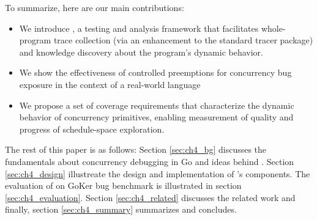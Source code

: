 To summarize, here are our main contributions:
\begin{itemize}
    \item We introduce \goat, a testing and analysis framework that facilitates whole-program trace collection (via an enhancement to the standard tracer package) and knowledge discovery about the program's dynamic behavior.
    \item We show the effectiveness of controlled preemptions for concurrency bug exposure in the context of a real-world language
    \item We propose a set of coverage requirements that characterize the dynamic behavior of concurrency primitives, enabling measurement of quality and progress of schedule-space exploration.
\end{itemize}

The rest of this paper is as follows: Section \ref{sec:ch4_bg} discusses the fundamentals about concurrency debugging in Go and ideas behind \goat. Section \ref{sec:ch4_design} illustreate the design and implementation of \goat's components. The evaluation of \goat on GoKer bug benchmark is illustrated in section \ref{sec:ch4_evaluation}. Section \ref{sec:ch4_related} discusses the related work and finally, section \ref{sec:ch4_summary} summarizes and concludes.
